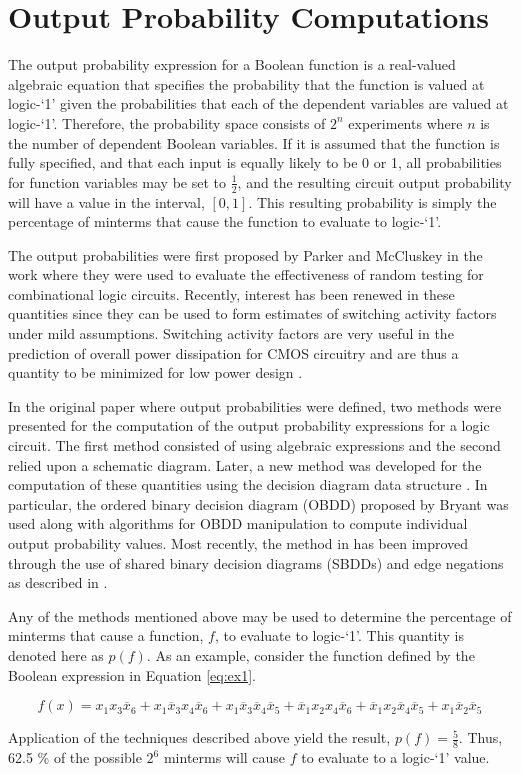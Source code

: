 \section{Output Probability Computations}
The output probability expression for a Boolean function is a real-valued
algebraic equation that specifies the probability that the function 
is valued at logic-`1' given the probabilities that each of the dependent variables
are valued at logic-`1'.  
Therefore, the probability
space consists of $2^n$ experiments where $n$ is the number of dependent
Boolean variables.  
If it is assumed that the function is fully specified,
and that each input is equally likely to be 0 or 1, all probabilities for
function variables may be set to $\frac{1}{2}$, and the resulting circuit
output probability will have a value in the interval, $[0,1]$.
This resulting probability is simply the percentage of minterms that
cause the function to evaluate to logic-`1'.

The output probabilities were first proposed by Parker and McCluskey
in the work \cite{PM75} where they were used to evaluate the effectiveness of
random testing for combinational logic circuits.  Recently, interest has been
renewed in these quantities 
since they can be used to form estimates of switching activity factors
under
mild assumptions.  Switching activity factors are very
useful in the prediction of overall power dissipation for CMOS 
circuitry and are thus a quantity to be minimized for low 
power design \cite{GDKW92} \cite{MP96} \cite{TPD93}.

In the original paper \cite{PM75} where output probabilities were defined, 
two methods were presented for the computation
of the output probability expressions for a logic circuit.  The first method
consisted of using algebraic expressions and the second relied upon a schematic
diagram.  Later, a new method was developed for the computation of these quantities
using the decision diagram data structure \cite{TN94e}.  In particular, the 
ordered binary decision diagram (OBDD) proposed by Bryant \cite{RB86} was used
along with algorithms for OBDD manipulation to compute individual output
probability values.  Most recently, the method in \cite{TN94e} has been improved
through the use of shared binary decision diagrams (SBDDs) and edge negations
as described in \cite{DM95}.

Any of the methods mentioned above may be used to determine
the percentage of minterms that cause a function, $f$, to evaluate to logic-`1'.
This quantity is denoted here as $p(f)$.  As an example, consider the function
defined by the Boolean expression in Equation \ref{eq:ex1}.

\begin{equation}
f(x) = x_1 x_3 \overline{x}_6 + x_1 \overline{x}_3 x_4 \overline{x}_6
+ x_1 \overline{x}_3 \overline{x}_4 \overline{x}_5
+ \overline{x}_1 x_2 x_4 \overline{x}_6
+ \overline{x}_1 x_2 \overline{x}_4 \overline{x}_5
+ x_1 \overline{x}_2 \overline{x}_5    \label{eq:ex1}
\end{equation}

Application of the techniques described above yield the result, $p(f) = \frac{5}{8}$.
Thus, 62.5 \% of the possible $2^6$ minterms will cause $f$ to evaluate to a logic-`1' value.

